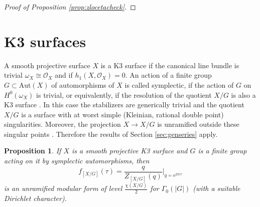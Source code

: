 \documentclass[11pt,a4paper]{amsart}
\newtheorem{proposition}[theorem]{Proposition}
\theoremstyle{definition}
\newcommand{\SZ}{\mathbb{Z}}                    %
\newcommand{\SC}{\mathbb{C}}                    %
\newcommand{\CO}{\mathcal{O}}                    %
\begin{document}
\begin{proof}[{Proof of Proposition \ref{prop:zlocetacheck}}]
\begin{comment}
Part (2): For $\Delta=D_n$, $n \geq 1$ the series $Z_{[\SC^2/G_\Delta]}(q)$ enumerates the Young walls of the corresponding type $D_n$ \cite{gyenge2015euler}.

By Lemma \ref{lem:locmod} the series $1/Z_{D_4}(\tau)$, resp.  $1/Z_{D_5}(\tau)$, resp.  $1/Z_{D_6}(\tau)$, resp. $1/Z_{E_6}(\tau)$ is a holomorphic  modular forms of weight $1/2$ for the principal congruence subgroup $\Gamma(16)$, resp. $\Gamma(96)$, resp. $\Gamma(64)$, resp. $\Gamma(72)$.

For $k \in 1/2\SZ$ let $\mathcal{M}_{k}(\Gamma_1(4N))$ be the space of a holomorphic  modular forms of weight $k$ for $\Gamma_1(4N)$. Let $\theta(\tau)=\sum_{n=-\infty}^{\infty} mathrm{e}^{2 \pi i n^2 \tau}$ be the Jacobi theta function. It is a holomorphic  modular forms of weight $1/2$ for $\Gamma_1(4)$. The multiplication by $\theta^3$ induces an embedding
\[ \mathcal{M}_{1/2}(\Gamma_1(4N)) \hookrightarrow \mathcal{M}_{2}(\Gamma_1(4N)). \]
\[ \mathrm{dim}\mathcal{M}_{2}(\Gamma_1(4N))=\frac{d_N}{12N}+ \frac{1}{4}\sum_{d \mid N}\phi(d)\phi\left(\frac{N}{d}\right),\]
where
\[  \]

\end{comment}

\end{proof}





\section{K3 surfaces}
\label{sec:k3surf}

A smooth projective surface $X$ is a K3 surface if the canonical line bundle is trivial $\omega_X \cong \CO_X$ and if $h_1(X,\CO_X)=0$. An action of a finite group $G \subset \mathrm{Aut}(X)$ of automorphisms of $X$ is called symplectic, if the action of $G$ on $H^0(\omega_X)$ is trivial, or equivalently, if the resolution of the quotient $X/G$ is also a K3 surface \cite[Page 1]{xiao1996galois}. In this case the stabilizers are generically trivial and the quotient $X/G$ is a surface with at worst simple (Kleinian, rational double point) singularities. Moreover, the projection $ X \to X/G$ is unramified outside these singular points \cite{mukai1988finite}. Therefore the results of Section \ref{sec:genseries} apply.

\begin{proposition} 
\label{prop:k3mod}
If $X$ is a smooth projective K3 surface and $G$ is a finite group acting on it by symplectic automorphisms, then
\[f_{[X/G]}(\tau)=\frac{q}{Z_{[X/G]}(q)}\Big|_{q=\mathrm{e}^{2 \pi i \tau}}\]
is an unramified modular form of level $\frac{\chi(X/G)}{2}$ for $\Gamma_0(|G|)$ (with a suitable Dirichlet character).
\end{proposition}
\end{document}
